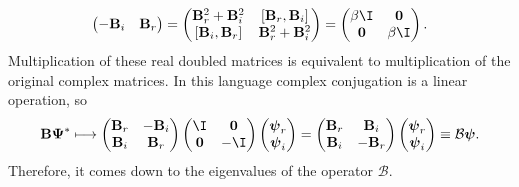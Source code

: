 \documentclass[11pt]{article}
\newcommand{\cc}{^\ast}
\newcommand{\B}{\mathbf{B}}
\newcommand{\psib}{\boldsymbol{\psi}}
\newcommand{\Psib}{\boldsymbol{\Psi}}
\begin{document}
\begin{equation*}
\begin{gathered}
\begin{pmatrix}
           -\B_i & \B_r \\
         \end{pmatrix}
  =
         \begin{pmatrix}
           \B_r^2 + \B_i^2 & [\B_r, \B_i]    \\
           [\B_i, \B_r]    & \B_r^2 + \B_i^2 \\
         \end{pmatrix}
  =
         \begin{pmatrix}
           \beta \I   & \mathbf{0} \\
           \mathbf{0} & \beta \I   \\
         \end{pmatrix}
  .
\end{gathered}
\end{equation*}
%
Multiplication of these real doubled matrices is equivalent to multiplication of the original complex matrices.
In this language complex conjugation is a linear operation, so
%
\begin{equation}\label{eq:doublingtrick}
  \B \Psib\cc \longmapsto
         \begin{pmatrix}
           \B_r & -\B_i \\
           \B_i &  \B_r \\
         \end{pmatrix}
         \begin{pmatrix}
           \I  & \mathbf{0} \\
           \mathbf{0} & -\I   \\
         \end{pmatrix}
         \begin{pmatrix}
           \psib_r \\
           \psib_i \\
         \end{pmatrix}
  =
         \begin{pmatrix}
           \B_r &  \B_i \\
           \B_i & -\B_r \\
         \end{pmatrix}
         \begin{pmatrix}
           \psib_r \\
           \psib_i \\
         \end{pmatrix}
  \equiv \mathcal{B} \psib.
\end{equation}
%
Therefore, it comes down to the eigenvalues of the operator \(\mathcal{B}\).
\end{document}
